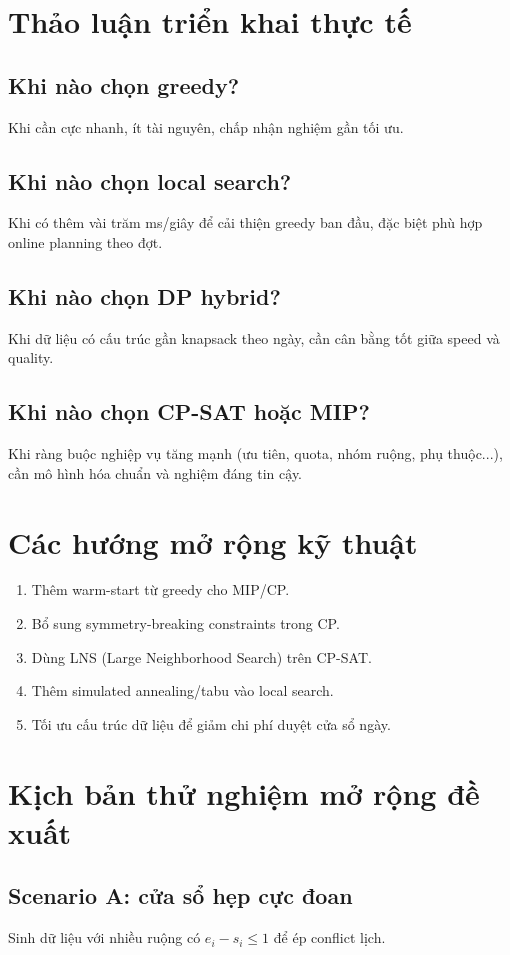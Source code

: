 \documentclass[12pt,a4paper]{article}
\begin{document}
\section{Thảo luận triển khai thực tế}
\subsection{Khi nào chọn greedy?}
Khi cần cực nhanh, ít tài nguyên, chấp nhận nghiệm gần tối ưu.

\subsection{Khi nào chọn local search?}
Khi có thêm vài trăm ms/giây để cải thiện greedy ban đầu, đặc biệt phù hợp online planning theo đợt.

\subsection{Khi nào chọn DP hybrid?}
Khi dữ liệu có cấu trúc gần knapsack theo ngày, cần cân bằng tốt giữa speed và quality.

\subsection{Khi nào chọn CP-SAT hoặc MIP?}
Khi ràng buộc nghiệp vụ tăng mạnh (ưu tiên, quota, nhóm ruộng, phụ thuộc...), cần mô hình hóa chuẩn và nghiệm đáng tin cậy.

\section{Các hướng mở rộng kỹ thuật}
\begin{enumerate}
  \item Thêm warm-start từ greedy cho MIP/CP.
  \item Bổ sung symmetry-breaking constraints trong CP.
  \item Dùng LNS (Large Neighborhood Search) trên CP-SAT.
  \item Thêm simulated annealing/tabu vào local search.
  \item Tối ưu cấu trúc dữ liệu để giảm chi phí duyệt cửa sổ ngày.
\end{enumerate}

\section{Kịch bản thử nghiệm mở rộng đề xuất}
\subsection{Scenario A: cửa sổ hẹp cực đoan}
Sinh dữ liệu với nhiều ruộng có $e_i-s_i \le 1$ để ép conflict lịch.
\end{document}
